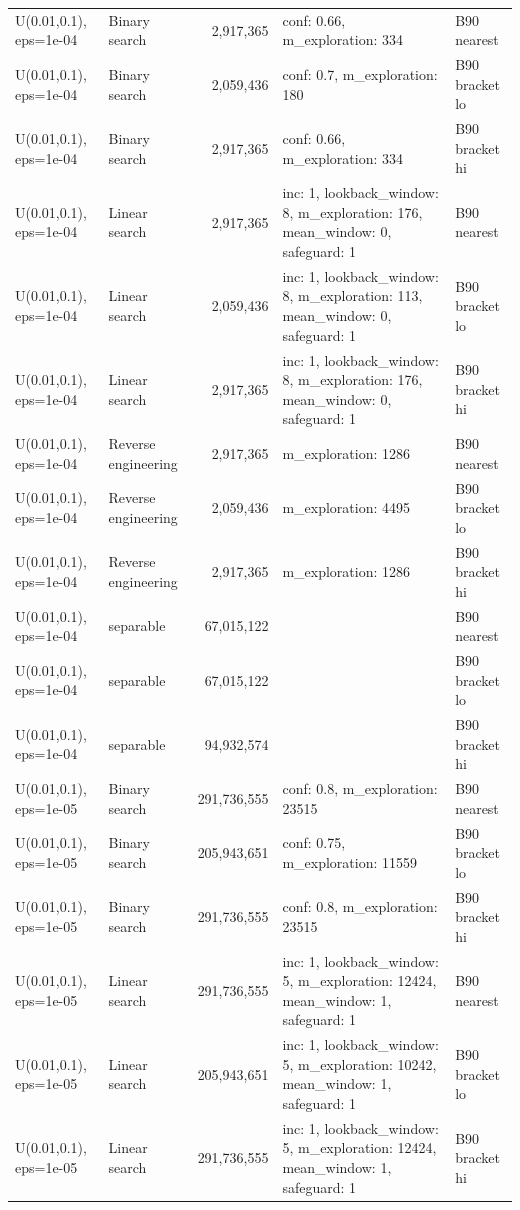 \begin{tabular}{llrll}
U(0.01,0.1), eps=1e-04 & Binary search & 2,917,365 & conf: 0.66, m\_exploration: 334 & B90 nearest \\
U(0.01,0.1), eps=1e-04 & Binary search & 2,059,436 & conf: 0.7, m\_exploration: 180 & B90 bracket lo \\
U(0.01,0.1), eps=1e-04 & Binary search & 2,917,365 & conf: 0.66, m\_exploration: 334 & B90 bracket hi \\
U(0.01,0.1), eps=1e-04 & Linear search & 2,917,365 & inc: 1, lookback\_window: 8, m\_exploration: 176, mean\_window: 0, safeguard: 1 & B90 nearest \\
U(0.01,0.1), eps=1e-04 & Linear search & 2,059,436 & inc: 1, lookback\_window: 8, m\_exploration: 113, mean\_window: 0, safeguard: 1 & B90 bracket lo \\
U(0.01,0.1), eps=1e-04 & Linear search & 2,917,365 & inc: 1, lookback\_window: 8, m\_exploration: 176, mean\_window: 0, safeguard: 1 & B90 bracket hi \\
U(0.01,0.1), eps=1e-04 & Reverse engineering & 2,917,365 & m\_exploration: 1286 & B90 nearest \\
U(0.01,0.1), eps=1e-04 & Reverse engineering & 2,059,436 & m\_exploration: 4495 & B90 bracket lo \\
U(0.01,0.1), eps=1e-04 & Reverse engineering & 2,917,365 & m\_exploration: 1286 & B90 bracket hi \\
U(0.01,0.1), eps=1e-04 & separable & 67,015,122 &  & B90 nearest \\
U(0.01,0.1), eps=1e-04 & separable & 67,015,122 &  & B90 bracket lo \\
U(0.01,0.1), eps=1e-04 & separable & 94,932,574 &  & B90 bracket hi \\
U(0.01,0.1), eps=1e-05 & Binary search & 291,736,555 & conf: 0.8, m\_exploration: 23515 & B90 nearest \\
U(0.01,0.1), eps=1e-05 & Binary search & 205,943,651 & conf: 0.75, m\_exploration: 11559 & B90 bracket lo \\
U(0.01,0.1), eps=1e-05 & Binary search & 291,736,555 & conf: 0.8, m\_exploration: 23515 & B90 bracket hi \\
U(0.01,0.1), eps=1e-05 & Linear search & 291,736,555 & inc: 1, lookback\_window: 5, m\_exploration: 12424, mean\_window: 1, safeguard: 1 & B90 nearest \\
U(0.01,0.1), eps=1e-05 & Linear search & 205,943,651 & inc: 1, lookback\_window: 5, m\_exploration: 10242, mean\_window: 1, safeguard: 1 & B90 bracket lo \\
U(0.01,0.1), eps=1e-05 & Linear search & 291,736,555 & inc: 1, lookback\_window: 5, m\_exploration: 12424, mean\_window: 1, safeguard: 1 & B90 bracket hi \\

\end{tabular}
